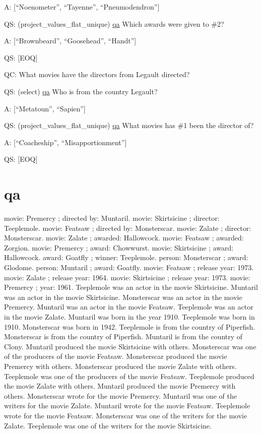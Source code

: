 \documentclass[
]{article}
\begin{document}
A: {[}``Noenometer'', ``Tayenne'', ``Pneumodendron''{]}

QS: (project\_values\_flat\_unique) \hyperref[qa]{qa} Which awards were
given to \#2?

A: {[}``Brownbeard'', ``Goosehead'', ``Handt''{]}

QS: {[}EOQ{]}

QC: What movies have the directors from Legault directed?

QS: (select) \hyperref[qa]{qa} Who is from the country Legault?

A: {[}``Metatoun'', ``Sapien''{]}

QS: (project\_values\_flat\_unique) \hyperref[qa]{qa} What movies has
\#1 been the director of?

A: {[}``Coacheship'', ``Misapportionment''{]}

QS: {[}EOQ{]}

\section{qa}\label{qa}

movie: Premercy ; directed by: Muntaril. movie: Skirtsicine ; director:
Teeplemole. movie: Featsaw ; directed by: Monsterscar. movie: Zalate ;
director: Monsterscar. movie: Zalate ; awarded: Hallowcock. movie:
Featsaw ; awarded: Zorgion. movie: Premercy ; award: Chowwurst. movie:
Skirtsicine ; award: Hallowcock. award: Goatfly ; winner: Teeplemole.
person: Monsterscar ; award: Glodome. person: Muntaril ; award: Goatfly.
movie: Featsaw ; release year: 1973. movie: Zalate ; release year: 1964.
movie: Skirtsicine ; release year: 1973. movie: Premercy ; year: 1961.
Teeplemole was an actor in the movie Skirtsicine. Muntaril was an actor
in the movie Skirtsicine. Monsterscar was an actor in the movie
Premercy. Muntaril was an actor in the movie Featsaw. Teeplemole was an
actor in the movie Zalate. Muntaril was born in the year 1910.
Teeplemole was born in 1910. Monsterscar was born in 1942. Teeplemole is
from the country of Piperfish. Monsterscar is from the country of
Piperfish. Muntaril is from the country of Clony. Muntaril produced the
movie Skirtsicine with others. Monsterscar was one of the producers of
the movie Featsaw. Monsterscar produced the movie Premercy with others.
Monsterscar produced the movie Zalate with others. Teeplemole was one of
the producers of the movie Featsaw. Teeplemole produced the movie Zalate
with others. Muntaril produced the movie Premercy with others.
Monsterscar wrote for the movie Premercy. Muntaril was one of the
writers for the movie Zalate. Muntaril wrote for the movie Featsaw.
Teeplemole wrote for the movie Featsaw. Monsterscar was one of the
writers for the movie Zalate. Teeplemole was one of the writers for the
movie Skirtsicine.
\end{document}
